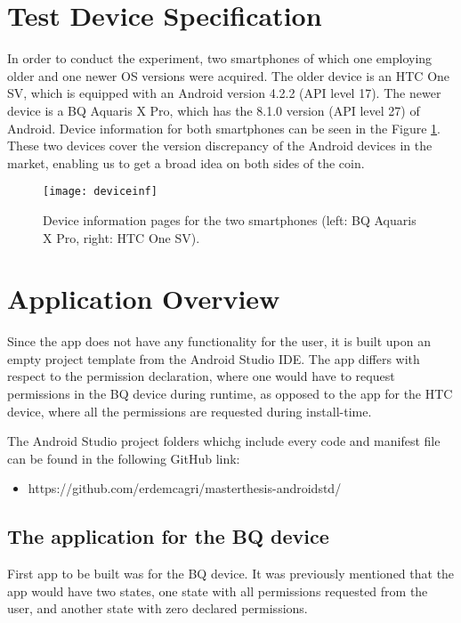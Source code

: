 \documentclass[
  a4paper,  %
  twoside,  %
  bibliography=totoc,
  headsepline,
  cleardoublepage=empty,
  parskip=half,
  draft=false,
  open=any
]{scrbook}
\begin{document}
\section{Test Device Specification}
In order to conduct the experiment, two smartphones of which one employing older and one newer OS versions were acquired. The older device is an HTC One SV, which is equipped with an Android version 4.2.2 (API level 17). The newer device is a BQ Aquaris X Pro, which has the 8.1.0 version (API level  27) of Android. Device information for both smartphones can be seen in the Figure \ref{devinf}. These two devices cover the version discrepancy of the Android devices in the market, enabling us to get a broad idea on both sides of the coin.
\begin{figure}\centering
	\texttt{[image: deviceinf]}
	\caption{Device information pages for the two smartphones (left: BQ Aquaris X Pro, right: HTC One SV).}
	\label{devinf}
\end{figure} 

\section{Application Overview}
Since the app does not have any functionality for the user, it is built upon an empty project template from the Android Studio IDE. The app differs with respect to the permission declaration, where one would have to request permissions in the BQ device during runtime, as opposed to the app for the HTC device, where all the permissions are requested during install-time. 

The Android Studio project folders whichg include every code and manifest file can be found in the following GitHub link:

\begin{itemize}
	\item https://github.com/erdemcagri/masterthesis-androidstd/
\end{itemize}

\subsection{The application for the BQ device}
First app to be built was for the BQ device. It was previously mentioned that the app would have two states, one state with all permissions requested from the user, and another state with zero declared permissions.
\end{document}
